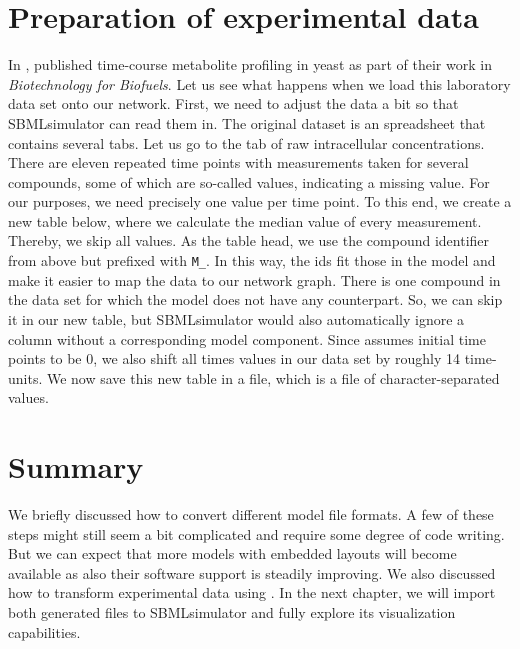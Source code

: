 \section{Preparation of experimental data}

In \citeyear{Bergdahl2012}, \citeauthor{Bergdahl2012} published time-course metabolite profiling in yeast as part of their work in \emph{Biotechnology for Biofuels}.
Let us see what happens when we load this laboratory data set onto our network.
First, we need to adjust the data a bit so that SBMLsimulator can read them in.
The original dataset is an \Excel spreadsheet that contains several tabs.
Let us go to the tab of raw intracellular concentrations.
There are eleven repeated time points with measurements taken for several compounds, some of which are so-called \NaN values, indicating a missing value.
For our purposes, we need precisely one value per time point.
To this end, we create a new table below, where we calculate the median value of every measurement.
Thereby, we skip all \NaN values.
As the table head, we use the compound identifier from above but prefixed with \texttt{M\_}.
In this way, the ids fit those in the \SBML model and make it easier to map the data to our network graph.
There is one compound in the data set for which the model does not have any counterpart.
So, we can skip it in our new table, but SBMLsimulator would also automatically ignore a column without a corresponding model component.
Since \SBML assumes initial time points to be 0, we also shift all times values in our data set by roughly 14 time-units.
We now save this new table in a \CSV file, which is a file of character-separated values.

\section{Summary}

We briefly discussed how to convert different model file formats.
A few of these steps might still seem a bit complicated and require some degree of code writing.
But we can expect that more models with embedded layouts will become available as also their software support is steadily improving.
We also discussed how to transform experimental data using \Excel.
In the next chapter, we will import both generated files to SBMLsimulator and fully explore its visualization capabilities.


